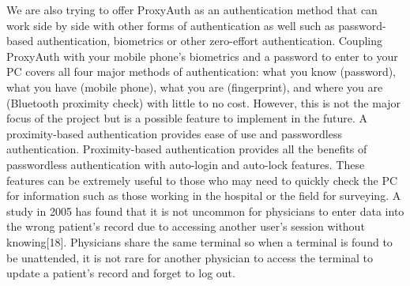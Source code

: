 \documentclass[letterpaper,twocolumn,10pt]{article}
\begin{document}
We are also trying to offer ProxyAuth as an authentication method that can work side by side with other forms of authentication as well such as password-based authentication, biometrics or other zero-effort authentication. Coupling ProxyAuth with your mobile phone's biometrics and a password to enter to your PC covers all four major methods of authentication: what you know (password), what you have (mobile phone), what you are (fingerprint), and where you are (Bluetooth proximity check) with little to no cost. However, this is not the major focus of the project but is a possible feature to implement in the future. A proximity-based authentication provides ease of use and passwordless authentication. Proximity-based authentication provides all the benefits of passwordless authentication with auto-login and auto-lock features. These features can be extremely useful to those who may need to quickly check the PC for information such as those working in the hospital or the field for surveying. A study in 2005 has found that it is not uncommon for physicians to enter data into the wrong patient's record due to accessing another user's session without knowing[18]. Physicians share the same terminal so when a terminal is found to be unattended, it is not rare for another physician to access the terminal to update a patient's record and forget to log out.
\end{document}
